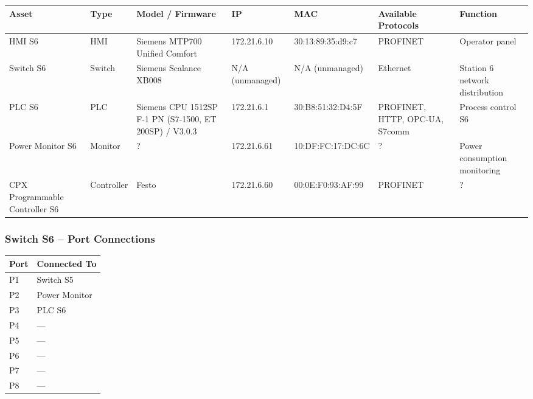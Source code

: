 \begin{adjustbox}{max width=\textwidth}
\begin{tabular}{lllllll}
\toprule
\textbf{Asset} & \textbf{Type} & \textbf{Model / Firmware} & \textbf{IP} & \textbf{MAC} & \textbf{Available Protocols} & \textbf{Function} \\
\midrule
HMI S6                         & HMI        & Siemens MTP700 Unified Comfort & 172.21.6.10     & 30:13:89:35:d9:c7 & PROFINET & Operator panel \\
Switch S6                      & Switch     & Siemens Scalance XB008         & N/A (unmanaged) & N/A (unmanaged)   & Ethernet & Station 6 network distribution \\
PLC S6                         & PLC        & Siemens CPU 1512SP F-1 PN (S7-1500, ET 200SP) / V3.0.3 & 172.21.6.1 & 30:B8:51:32:D4:5F & PROFINET, HTTP, OPC-UA, S7comm & Process control S6 \\
Power Monitor S6               & Monitor    & ?                              & 172.21.6.61     & 10:DF:FC:17:DC:6C & ? & Power consumption monitoring \\
CPX Programmable Controller S6 & Controller & Festo                          & 172.21.6.60     & 00:0E:F0:93:AF:99 & PROFINET & ? \\
\bottomrule
\end{tabular}
\end{adjustbox}

\subsubsection{Switch S6 – Port Connections}

\begin{tabular}{ll}
\toprule
\textbf{Port} & \textbf{Connected To} \\
\midrule
P1 & Switch S5 \\
P2 & Power Monitor \\
P3 & PLC S6 \\
P4 & — \\
P5 & — \\
P6 & — \\
P7 & — \\
P8 & — \\
\bottomrule
\end{tabular}
